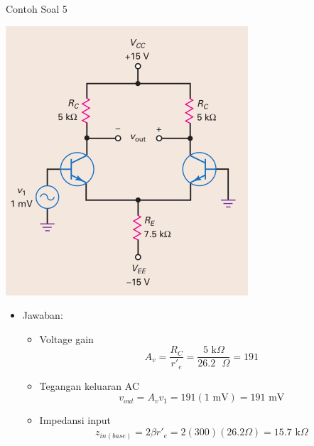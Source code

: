 \documentclass[aspectratio=169]{beamer}
\begin{document}
\begin{frame}{Contoh Soal 5}
	\begin{multicols}{2}
		\begin{center}
			\includegraphics[height=0.7\textheight]{gambar/01.diff-amp/01.contoh_soal_1-2}
		\end{center}
		\columnbreak
		\begin{itemize}
			\item Jawaban:
			\begin{itemize}
				\item Voltage gain
				\[ A_v = \frac{R_C}{r'_e} = \frac{5 \text{ k}\Omega }{26.2 \text{ }\Omega } = 191 \]
				\item Tegangan keluaran AC
				\[ v_{out} = A_v v_1 = 191(1 \text{ mV}) = 191 \text{ mV} \]
				\item Impedansi input
				\[ z_{in(base)} = 2 \beta r'_e = 2(300)(26.2\Omega) = 15.7 \text{ k}\Omega\]
			\end{itemize}
		\end{itemize}
	\end{multicols}
\end{frame}
\end{document}
